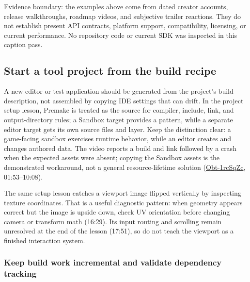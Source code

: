 Evidence boundary: the examples above come from dated creator accounts, release walkthroughs, roadmap videos, and subjective trailer reactions. They do not establish present API contracts, platform support, compatibility, licensing, or current performance. No repository code or current SDK was inspected in this caption pass.

\subsection{Start a tool project from the build recipe}\label{05-engine-i-ch013-start-a-tool-project-from-the-build-recipe}

\hypertarget{05-engine-i-ch013-start-a-tool-project-from-the-build-recipe}{}

A new editor or test application should be generated from the project's build description, not assembled by copying IDE settings that can drift. In the project setup lesson, Premake is treated as the source for compiler, include, link, and output-directory rules; a Sandbox target provides a pattern, while a separate editor target gets its own source files and layer. Keep the distinction clear: a game-facing sandbox exercises runtime behavior, while an editor creates and changes authored data. The video reports a build and link followed by a crash when the expected assets were absent; copying the Sandbox assets is the demonstrated workaround, not a general resource-lifetime solution (\href{https://www.youtube.com/watch?v=Qbt-1rcSqZc}{Qbt-1rcSqZc}, 01:53--10:08).

The same setup lesson catches a viewport image flipped vertically by inspecting texture coordinates. That is a useful diagnostic pattern: when geometry appears correct but the image is upside down, check UV orientation before changing camera or transform math (16:29). Its input routing and scrolling remain unresolved at the end of the lesson (17:51), so do not teach the viewport as a finished interaction system.

\subsubsection{Keep build work incremental and validate dependency tracking}\label{05-engine-i-ch013-keep-build-work-incremental-and-validate-dependency-tracking}

\hypertarget{05-engine-i-ch013-keep-build-work-incremental-and-validate-dependency-tracking}{}

